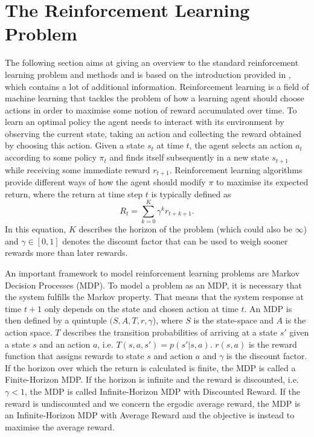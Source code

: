 \documentclass[../main.tex]{subfiles}
\begin{document}
\section{The Reinforcement Learning Problem}\label{sec:RL}
The following section aims at giving an overview to the standard reinforcement learning problem and methods and is based on the introduction provided in \cite{sutton1998reinforcement}, which contains a lot of additional information.
Reinforcement learning is a field of machine learning that tackles the problem of how a learning agent should choose actions in order to maximise some notion of reward accumulated over time. To learn an optimal policy the agent needs to interact with its environment by observing the current state, taking an action and collecting the reward obtained by choosing this action. Given a state $s_t$ at time $t$, the agent selects an action $a_t$ according to some policy $\pi_t$ and finds itself subsequently in a new state $s_{t+1}$ while receiving some immediate reward $r_{t+1}$. Reinforcement learning algorithms provide different ways of how the agent should modify $\pi$ to maximise its expected return, where the return at time step $t$ is typically defined as
\begin{equation}
R_t = \sum_{k=0}^K \gamma^kr_{t+k+1}.
\end{equation}
In this equation, $K$ describes the horizon of the problem (which could also be $\infty$) and $\gamma \in [0,1]$ denotes the discount factor that can be used to weigh sooner rewards more than later rewards.\par
An important framework to model reinforcement learning problems are Markov Decision Processes (MDP). To model a problem as an MDP, it is necessary that the system fulfills the Markov property. That means that the system response at time $t+1$ only depends on the state and chosen action at time $t$. An MDP is then defined by a quintuple $(S,A,T,r,\gamma$), where $S$ is the state-space and $A$ is the action space. $T$ describes the transition probabilities of arriving at a state $s'$ given a state $s$ and an action $a$, i.e. $T(s,a,s') = p(s'|s,a)$. $r(s,a)$ is the reward function that assigns rewards to state $s$ and action $a$ and $\gamma$ is the discount factor. If the horizon over which the return is calculated is finite, the MDP is called a Finite-Horizon MDP. If the horizon is infinite and the reward is discounted, i.e. $\gamma<1$, the MDP is called Infinite-Horizon MDP with Discounted Reward. If the reward is undiscounted and we concern the ergodic average reward, the MDP is an Infinite-Horizon MDP with Average Reward and the objective is instead to maximise the average reward.\par
\end{document}
